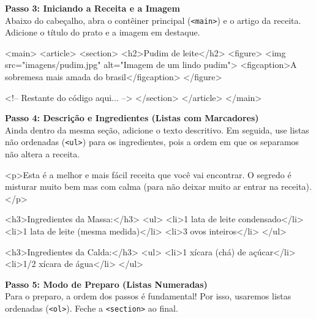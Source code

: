 \documentclass[12pt,a4paper]{article}
\begin{document}
\noindent\textbf{Passo 3: Iniciando a Receita e a Imagem}\\
Abaixo do cabeçalho, abra o contêiner principal (\verb|<main>|) e o artigo da receita. Adicione o título do prato e a imagem em destaque.

\begin{codehtml}
        <main>
            <article>
                <section>
                    <h2>Pudim de leite</h2>
                    <figure>
                        <img src="imagens/pudim.jpg" alt="Imagem de um lindo pudim">
                        <figcaption>A sobremesa mais amada do brasil</figcaption>
                    </figure>

                <!-- Restante do código aqui... -->
                </section>
            </article>
        </main>
\end{codehtml}

\noindent\textbf{Passo 4: Descrição e Ingredientes (Listas com Marcadores)}\\
Ainda dentro da mesma seção, adicione o texto descritivo. Em seguida, use listas não ordenadas (\verb|<ul>|) para os ingredientes, pois a ordem em que os separamos não altera a receita.

\begin{codehtml}
                    <p>Esta é a melhor e mais fácil receita que você vai encontrar. O segredo é misturar muito bem mas com calma (para não deixar muito ar entrar na receita).</p>

                    <h3>Ingredientes da Massa:</h3>
                    <ul>
                        <li>1 lata de leite condensado</li>
                        <li>1 lata de leite (mesma medida)</li>
                        <li>3 ovos inteiros</li>
                    </ul>

                    <h3>Ingredientes da Calda:</h3>
                    <ul>
                        <li>1 xícara (chá) de açúcar</li>
                        <li>1/2 xícara de água</li>
                    </ul>
\end{codehtml}

\noindent\textbf{Passo 5: Modo de Preparo (Listas Numeradas)}\\
Para o preparo, a ordem dos passos é fundamental! Por isso, usaremos listas ordenadas (\verb|<ol>|). Feche a \verb|<section>| ao final.
\end{document}
